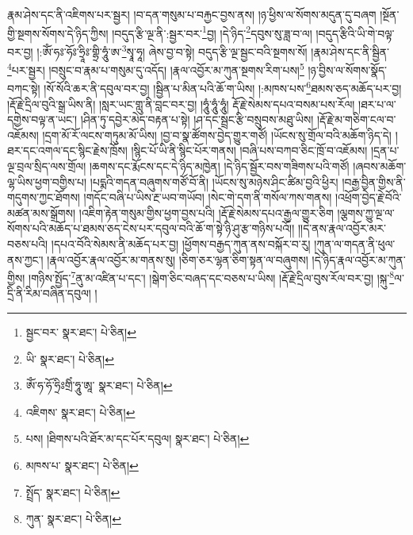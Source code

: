 རྣམ་ཤེས་དང་ནི་འཇིགས་པར་སྦྱར། །བ་དན་གསུམ་པ་བརྐྱང་བྱས་ནས། །ཉ་ཕྱིས་ལ་སོགས་མདུན་དུ་བཞག །སྔོན་གྱི་སྔགས་སོགས་དེ་ཉིད་ཀྱིས། །བདུད་རྩི་ལྔ་ནི་:སྦྱར་བར་\footnote{སྦྱང་བར་  སྣར་ཐང་།  པེ་ཅིན། }བྱ། །དེ་ཉིད་\footnote{ཡི་  སྣར་ཐང་།  པེ་ཅིན། }དབུས་སུ་ཟླ་བ་ལ། །བདུད་རྩིའི་ཡི་གེ་བལྟ་བར་བྱ། །:ཨོཾ་ཧཿ་ཧོཿ་ཧྲཱིཿ་གྷྲི་ཧཱུཾ་ཨ་\footnote{ཨོཾ་ཧ་ཧོ་ཧྲིཿགྲིཾ་ཧཱུ་ཨཱ་  སྣར་ཐང་།  པེ་ཅིན། }སྭཱ་ཧཱ། ཞེས་བྱ་བ་སྟེ། བདུད་རྩི་ལྔ་སྦྱང་བའི་སྔགས་སོ། །རྣམ་ཤེས་དང་ནི་སྦྱིན་\footnote{འཇིགས་  སྣར་ཐང་།  པེ་ཅིན། }པར་སྦྱར། །བསྲུང་བ་རྣམ་པ་གསུམ་དུ་འདོད། །རྣལ་འབྱོར་མ་ཀུན་སྔགས་རིག་པས།\footnote{པས། །ཐིགས་པའི་ཐོར་མ་དང་པོར་དབུལ།  སྣར་ཐང་།  པེ་ཅིན། } །ཉ་བྱིས་ལ་སོགས་སྣོད་བཀང་སྟེ། །སོ་སོའི་ཆར་ནི་དབུལ་བར་བྱ། །སྦྱིན་པ་མིན་པའི་ཆོ་ག་ཡིས། །:མཁས་པས་\footnote{མཁས་པ་  སྣར་ཐང་།  པེ་ཅིན། }ཐམས་ཅད་མཆོད་པར་བྱ། །རྡོ་རྗེ་དྲིལ་བུའི་སྒྲ་ཡིས་ནི། །སླར་ཡང་གླུ་ནི་བླང་བར་བྱ། །ཧཱུཾ་ཧཱུཾ་ཧཱུཾ། རྡོ་རྗེ་སེམས་དཔའ་བསམ་པས་རོལ། །ཐར་པ་ལ་དགྱེས་བལྟ་ན་ཡང་། །ཤིན་ཏུ་དབྱེར་མེད་བརྟན་པ་སྟེ། །ཤ་དང་སྦྲང་རྩི་བསྲུབས་མཐུ་ཡིས། །རྡོ་རྗེ་མ་གཅིག་ངལ་བ་འཇོམས། །དྲག་མོ་རོ་ལངས་གཏུམ་མོ་ཡིས། །བྱ་བ་སྣ་ཚོགས་བྱེད་གྱུར་གཙོ། །ཡོངས་སུ་གྲོལ་བའི་མཆོག་ཉིད་དེ། །ཐར་དང་འགལ་དང་སྙིང་རྗེས་ཁྲོས། །སྙིང་པོ་ཡི་ནི་སྙིང་པོར་གནས། །བཞི་པས་བཀབ་ཅིང་ཁྲོ་བ་འཇོམས། །དྲན་པ་ལྔ་བྲལ་སྲིད་ལས་གྲོལ། །ཆགས་དང་རྨོངས་དང་དེ་ཉིད་མཁྱེན། །དེ་ཉིད་སྦྱོར་བས་གཟིགས་པའི་གཙོ། །ཞབས་མཆོག་ལྷ་ཡིས་ཕྱག་བགྱིས་པ། །པདྨའི་གདན་བཞུགས་གཙོ་བོ་ནི། །ཡོངས་སུ་མཉེས་ཤིང་ཚིམ་བྱའི་ཕྱིར། །བརྒྱ་བྱིན་གྱིས་ནི་གདུགས་ཀྱང་ཐོགས། །གདོང་བཞི་པ་ཡིས་རྔ་ཡབ་གཡོབ། །སེང་གེ་དག་ནི་གསོལ་ཀས་གནས། །འཕྲོག་བྱེད་རྗེ་བོའི་མཚན་མས་སྒྲོགས། །འཇིག་རྟེན་གསུམ་གྱིས་ཕྱག་བྱས་པའི། །རྡོ་རྗེ་སེམས་དཔའ་རྒྱལ་གྱུར་ཅིག །ལྕགས་ཀྱུ་ལྔ་ལ་སོགས་པའི་མཆོད་པ་ཐམས་ཅད་ངེས་པར་དབུལ་བའི་ཆོ་ག་སྟེ་ཉི་ཤུ་རྩ་གཉིས་པའོ།། །།དེ་ནས་རྣལ་འབྱོར་མར་བཅས་པའི། །དཔའ་བོའི་སེམས་ནི་མཆོད་པར་བྱ། །ཕྱོགས་བརྒྱད་ཀུན་ནས་བསྐོར་བ་རུ། །ཀུན་ལ་གདན་ནི་ཕུལ་ནས་ཀྱང་། །རྣལ་འབྱོར་རྣལ་འབྱོར་མ་གནས་སུ། །ཅིག་ཅར་ལྷན་ཅིག་སྟན་ལ་བཞུགས། །དེ་ཉིད་རྣལ་འབྱོར་མ་ཀུན་གྱིས། །གཉིས་སྤྱོད་\footnote{སྤྲོད་  སྣར་ཐང་།  པེ་ཅིན། }ནུ་མ་འཛིན་པ་དང་། །སྒེག་ཅིང་བཞད་དང་བཅས་པ་ཡིས། །རྡོ་རྗེ་དྲིལ་བུས་རོལ་བར་བྱ། །སྐུ་\footnote{ཀུན་  སྣར་ཐང་།  པེ་ཅིན། }ལ་དྲི་ནི་རིམ་བཞིན་དབུལ། །
